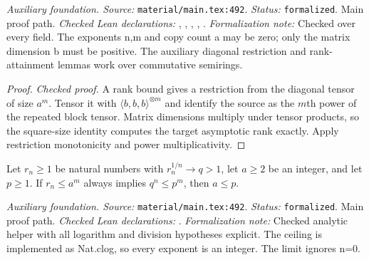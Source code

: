 \noindent\textit{Auxiliary foundation. Source:} \texttt{material/main.tex:492}.
\textit{Status:} \texttt{formalized}. Main proof path.
\textit{Checked Lean declarations:} , , , , .
\textit{Formalization note:} Checked over every field. The exponents n,m and copy count a may be zero; only the matrix dimension b must be positive. The auxiliary diagonal restriction and rank-attainment lemmas work over commutative semirings.

\begin{proof}
\leanok
{}
\textit{Checked proof.} A rank bound gives a restriction from the diagonal tensor of size $a^m$. Tensor it with $\langle b,b,b\rangle^{\otimes m}$ and identify the source as the $m$th power of the repeated block tensor. Matrix dimensions multiply under tensor products, so the square-size identity computes the target asymptotic rank exactly. Apply restriction monotonicity and power multiplicativity.
\end{proof}

\renewcommand{\thetheorem}{A47}
\begin{lemma}
\label{aux:integer-capacity-growth}
\leanok
Let $r_n\ge1$ be natural numbers with $r_n^{1/n}\to q>1$, let $a\ge2$ be an integer, and let $p\ge1$. If $r_n\le a^m$ always implies $q^n\le p^m$, then $a\le p$.
\end{lemma}

\noindent\textit{Auxiliary foundation. Source:} \texttt{material/main.tex:492}.
\textit{Status:} \texttt{formalized}. Main proof path.
\textit{Checked Lean declarations:} .
\textit{Formalization note:} Checked analytic helper with all logarithm and division hypotheses explicit. The ceiling is implemented as Nat.clog, so every exponent is an integer. The limit ignores n=0.

